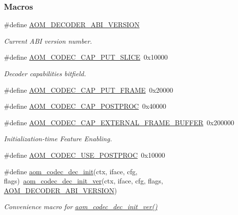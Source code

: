 \subsubsection*{Macros}
\begin{DoxyCompactItemize}
\item 
\#define \hyperlink{group__decoder_ga23378c7ca8c361c097181aaaa2a5a734}{A\+O\+M\+\_\+\+D\+E\+C\+O\+D\+E\+R\+\_\+\+A\+B\+I\+\_\+\+V\+E\+R\+S\+I\+ON}\hypertarget{group__decoder_ga23378c7ca8c361c097181aaaa2a5a734}{}\label{group__decoder_ga23378c7ca8c361c097181aaaa2a5a734}

\begin{DoxyCompactList}\small\item\em Current A\+BI version number. \end{DoxyCompactList}\item 
\#define \hyperlink{group__decoder_ga1e50f39bf0434fc5d18aeed80e06d044}{A\+O\+M\+\_\+\+C\+O\+D\+E\+C\+\_\+\+C\+A\+P\+\_\+\+P\+U\+T\+\_\+\+S\+L\+I\+CE}~0x10000
\begin{DoxyCompactList}\small\item\em Decoder capabilities bitfield. \end{DoxyCompactList}\item 
\#define \hyperlink{group__decoder_ga667591ede452c5625fcf9345c66514d5}{A\+O\+M\+\_\+\+C\+O\+D\+E\+C\+\_\+\+C\+A\+P\+\_\+\+P\+U\+T\+\_\+\+F\+R\+A\+ME}~0x20000
\item 
\#define \hyperlink{group__decoder_gabcb476dc9748f64ad4a3718419bffc47}{A\+O\+M\+\_\+\+C\+O\+D\+E\+C\+\_\+\+C\+A\+P\+\_\+\+P\+O\+S\+T\+P\+R\+OC}~0x40000
\item 
\#define \hyperlink{group__decoder_gabd11df9f35d52ea76de2c8d32aa36963}{A\+O\+M\+\_\+\+C\+O\+D\+E\+C\+\_\+\+C\+A\+P\+\_\+\+E\+X\+T\+E\+R\+N\+A\+L\+\_\+\+F\+R\+A\+M\+E\+\_\+\+B\+U\+F\+F\+ER}~0x200000
\begin{DoxyCompactList}\small\item\em Initialization-\/time Feature Enabling. \end{DoxyCompactList}\item 
\#define \hyperlink{group__decoder_ga7b6c145833964c9edd3ff78be017f7ec}{A\+O\+M\+\_\+\+C\+O\+D\+E\+C\+\_\+\+U\+S\+E\+\_\+\+P\+O\+S\+T\+P\+R\+OC}~0x10000
\item 
\#define \hyperlink{group__decoder_gafdbfca65b19ab1f6d72b32cd01753b9b}{aom\+\_\+codec\+\_\+dec\+\_\+init}(ctx,  iface,  cfg,  flags)~\hyperlink{group__decoder_gab2bfd2f5517b9452d2c71b7c2b2e8e8d}{aom\+\_\+codec\+\_\+dec\+\_\+init\+\_\+ver}(ctx, iface, cfg, flags, \hyperlink{group__decoder_ga23378c7ca8c361c097181aaaa2a5a734}{A\+O\+M\+\_\+\+D\+E\+C\+O\+D\+E\+R\+\_\+\+A\+B\+I\+\_\+\+V\+E\+R\+S\+I\+ON})
\begin{DoxyCompactList}\small\item\em Convenience macro for \hyperlink{group__decoder_gab2bfd2f5517b9452d2c71b7c2b2e8e8d}{aom\+\_\+codec\+\_\+dec\+\_\+init\+\_\+ver()} \end{DoxyCompactList}\end{DoxyCompactItemize}
